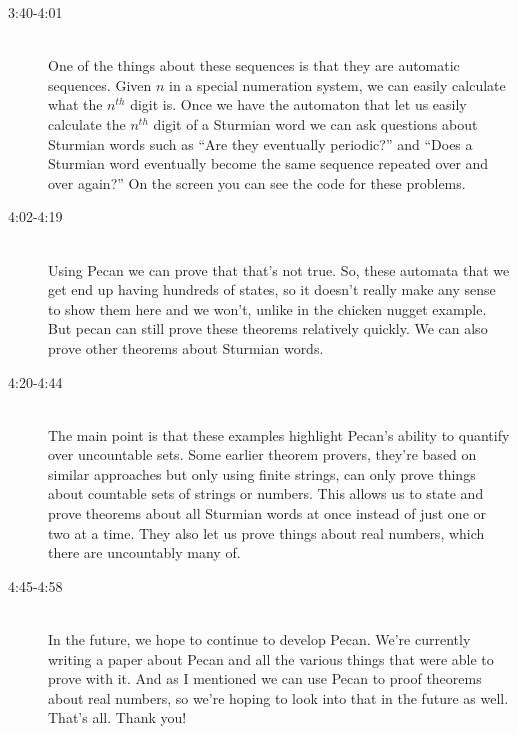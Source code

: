 \documentclass[12pt]{article}
\begin{document}
\begin{description}
\item[3:40-4:01]\hfill \\
One of the things about these sequences is that they are automatic sequences. Given $n$ in a special numeration system, we can easily calculate what the $n^{th}$ digit is. Once we have the automaton that let us easily calculate the $n^{th}$ digit of a Sturmian word we can ask questions about Sturmian words such as ``Are they eventually periodic?'' and ``Does a Sturmian word eventually become the same sequence repeated over and over again?'' On the screen you can see the code for these problems.

\item[4:02-4:19] \hfill \\
Using Pecan we can prove that that's not true. So, these automata that we get end up having hundreds of states, so it doesn't really make any sense to show them here and we won't, unlike in the chicken nugget example. But pecan can still prove these theorems relatively quickly. We can also prove other theorems about Sturmian words. 

\item[4:20-4:44]\hfill \\
The main point is that these examples highlight Pecan's ability to quantify over uncountable sets. Some earlier theorem provers, they're based on similar approaches but only using finite strings, can only prove things about countable sets of strings or numbers. This allows us to state and prove theorems about all Sturmian words at once instead of just one or two at a time. They also let us prove things about real numbers, which there are uncountably many of. 


\item[4:45-4:58]\hfill \\
In the future, we hope to continue to develop Pecan. We're currently writing a paper about Pecan and all the various things that were able to prove with it. And as I mentioned we can use Pecan to proof theorems about real numbers, so we're hoping to look into that in the future as well. That's all. Thank you!


\end{description}
\end{document}
